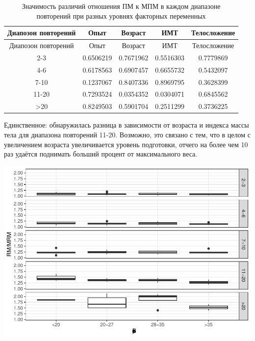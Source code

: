 \documentclass[
]{article}
\newenvironment{Shaded}{\begin{snugshade}}{\end{snugshade}}
\newcommand{\ControlFlowTok}[1]{\textcolor[rgb]{0.13,0.29,0.53}{\textbf{#1}}}
\newcommand{\DataTypeTok}[1]{\textcolor[rgb]{0.13,0.29,0.53}{#1}}
\newcommand{\DecValTok}[1]{\textcolor[rgb]{0.00,0.00,0.81}{#1}}
\newcommand{\KeywordTok}[1]{\textcolor[rgb]{0.13,0.29,0.53}{\textbf{#1}}}
\newcommand{\NormalTok}[1]{#1}
\newcommand{\OperatorTok}[1]{\textcolor[rgb]{0.81,0.36,0.00}{\textbf{#1}}}
\newcommand{\StringTok}[1]{\textcolor[rgb]{0.31,0.60,0.02}{#1}}
\begin{document}
\begin{Shaded}
\begin{Highlighting}[]
{{{{        \ControlFlowTok{function}\NormalTok{(x) }\KeywordTok{aov}\NormalTok{(RM}\OperatorTok{/}\NormalTok{MRM }\OperatorTok{~}\StringTok{ }\NormalTok{BodyType, data }\OperatorTok{%
\StringTok{            }\KeywordTok{summary}\NormalTok{() }\OperatorTok{%
    \DataTypeTok{align =} \StringTok{"ccccc"}\NormalTok{)}
\end{Highlighting}
\end{Shaded}

\begin{longtable}[]{@{}ccccc@{}}
\caption{Значимость различий отношения ПМ к МПМ в каждом диапазоне
повторений при разных уровнях факторных переменных}\tabularnewline
\toprule
Диапозон повторений & Опыт & Возраст & ИМТ & Телосложение\tabularnewline
\midrule
\endfirsthead
\toprule
Диапозон повторений & Опыт & Возраст & ИМТ & Телосложение\tabularnewline
\midrule
\endhead
2-3 & 0.6506219 & 0.7671962 & 0.5516303 & 0.7779869\tabularnewline
4-6 & 0.6178563 & 0.6907457 & 0.6655732 & 0.5432097\tabularnewline
7-10 & 0.1237067 & 0.8407336 & 0.8969795 & 0.3628399\tabularnewline
11-20 & 0.7293524 & 0.0354352 & 0.0304071 & 0.6845562\tabularnewline
\textgreater20 & 0.8249503 & 0.5901704 & 0.2511299 &
0.3736225\tabularnewline
\bottomrule
\end{longtable}

Единственное: обнаружилась разница в зависимости от возраста и индекса
массы тела для диапазона повторений 11-20. Возможно, это связано с тем,
что в целом с увеличением возраста увеличивается уровень подготовки,
отчего на более чем 10 раз удаётся поднимать больший процент от
максимального веса.

\begin{center}\includegraphics[width=0.9\linewidth]{Regression-model-for-estimating-RM_files/figure-latex/unnamed-chunk-23-1} \end{center}
\end{document}
